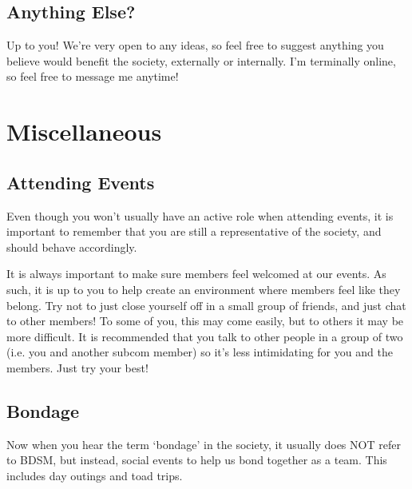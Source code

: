 \documentclass{article}
\begin{document}
\subsection{Anything Else?}
Up to you! We're very open to any ideas, so feel free to suggest anything you believe would benefit the society, externally or internally. I'm terminally online, so feel free to message me anytime!
\section{Miscellaneous}
\subsection{Attending Events}
Even though you won’t usually have an active role when attending events, it is important to remember that you are still a representative of the society, and should behave accordingly.

It is always important to make sure members feel welcomed at our events. As such, it is up to you to help create an environment where members feel like they belong. Try not to just close yourself off in a small group of friends, and just chat to other members! To some of you, this may come easily, but to others it may be more difficult. It is recommended that you talk to other people in a group of two (i.e. you and another subcom member) so it’s less intimidating for you and the members. Just try your best!
\subsection{Bondage}
Now when you hear the term ‘bondage’ in the society, it usually does NOT refer to BDSM, but instead, social events to help us bond together as a team. This includes day outings and toad trips.
\end{document}
